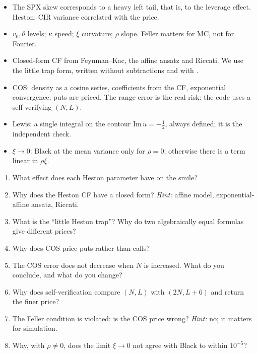 \begin{riassunto}
\begin{itemize}
\item The SPX skew corresponds to a heavy left tail, that is, to the leverage effect. Heston: CIR variance correlated
with the price.
\item $v_0,\theta$ levels; $\kappa$ speed; $\xi$ curvature; $\rho$ slope. Feller matters for MC, not for Fourier.
\item Closed-form CF from Feynman--Kac, the affine ansatz and Riccati. We use the little trap form, written without
subtractions and with .
\item COS: density as a cosine series, coefficients from the CF, exponential convergence; puts are priced. The range
error is the real risk: the code uses a self-verifying $(N,L)$.
\item Lewis: a single integral on the contour $\mathrm{Im}\,u=-\frac12$, always defined; it is the independent check.
\item $\xi\to0$: Black at the mean variance only for $\rho=0$; otherwise there is a term linear in $\rho\xi$.
\end{itemize}
\end{riassunto}

\begin{domande}
\begin{enumerate}
\item What effect does each Heston parameter have on the smile?
\item Why does the Heston CF have a closed form? \emph{Hint:} affine model, exponential-affine ansatz, Riccati.
\item What is the ``little Heston trap''? Why do two algebraically equal formulas give different prices?
\item Why does COS price puts rather than calls?
\item The COS error does not decrease when $N$ is increased. What do you conclude, and what do you change?
\item Why does self-verification compare $(N,L)$ with $(2N,L+6)$ and return the finer price?
\item The Feller condition is violated: is the COS price wrong? \emph{Hint:} no; it matters for simulation.
\item Why, with $\rho\ne0$, does the limit $\xi\to0$ not agree with Black to within $10^{-5}$?
\end{enumerate}
\end{domande}
